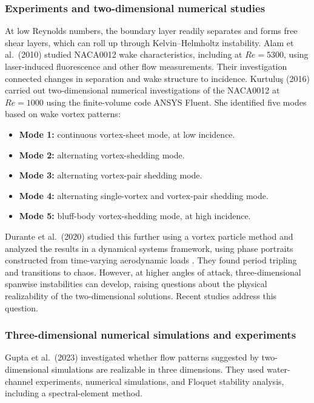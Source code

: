 \subsubsection{Experiments and two-dimensional numerical studies}
At low Reynolds numbers, the boundary layer readily separates and forms free shear layers, which can roll up through Kelvin--Helmholtz instability. Alam et al.\ (2010) \cite{alam} studied NACA0012 wake characteristics, including at $Re=5300$, using laser-induced fluorescence and other flow measurements. Their investigation connected changes in separation and wake structure to incidence. Kurtulu\c{s} (2016) \cite{kurtulus} carried out two-dimensional numerical investigations of the NACA0012 at $Re=1000$ using the finite-volume code ANSYS Fluent. She identified five modes based on wake vortex patterns:
\begin{itemize}
\item \textbf{Mode 1:} continuous vortex-sheet mode, at low incidence.
\item \textbf{Mode 2:} alternating vortex-shedding mode.
\item \textbf{Mode 3:} alternating vortex-pair shedding mode.
\item \textbf{Mode 4:} alternating single-vortex and vortex-pair shedding mode.
\item \textbf{Mode 5:} bluff-body vortex-shedding mode, at high incidence.
\end{itemize}

Durante et al.\ (2020) \cite{durante} studied this further using a vortex particle method and analyzed the results in a dynamical systems framework, using phase portraits constructed from time-varying aerodynamic loads \cite{strogatz}. They found period tripling and transitions to chaos. However, at higher angles of attack, three-dimensional spanwise instabilities can develop, raising questions about the physical realizability of the two-dimensional solutions. Recent studies address this question.

\subsubsection{Three-dimensional numerical simulations and experiments}
Gupta et al.\ (2023) \cite{gupta} investigated whether flow patterns suggested by two-dimensional simulations are realizable in three dimensions. They used water-channel experiments, numerical simulations, and Floquet stability analysis, including a spectral-element method.

